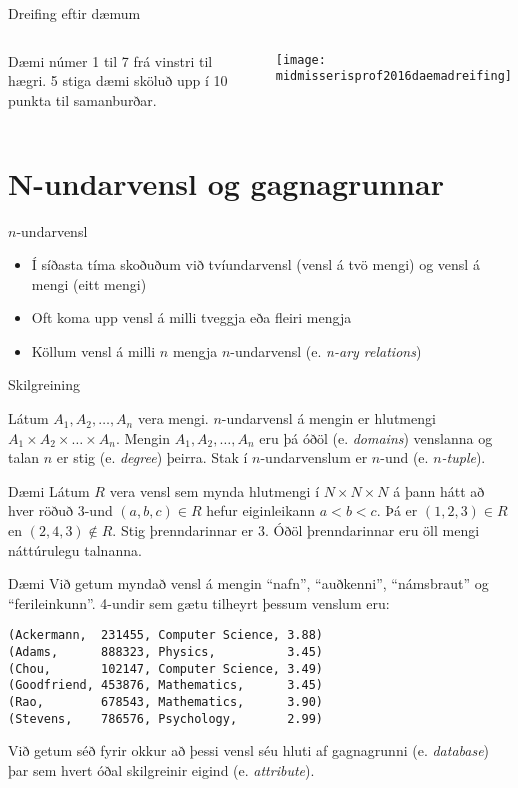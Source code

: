 \documentclass{beamer}
\begin{document}
\begin{frame}{Dreifing eftir dæmum}
\begin{columns}
Dæmi númer 1 til 7 frá vinstri til hægri. 5 stiga dæmi sköluð upp í 10 punkta til samanburðar.
\begin{center}
\texttt{[image: midmisserisprof2016daemadreifing]}
\end{center}
\end{columns}
\end{frame}

\section{N-undarvensl og gagnagrunnar}

\begin{frame}{$n$-undarvensl}
\begin{itemize}
 \item Í síðasta tíma skoðuðum við tvíundarvensl (vensl á tvö mengi) og vensl á mengi (eitt mengi)
 \item Oft koma upp vensl á milli tveggja eða fleiri mengja
 \item Köllum vensl á milli $n$ mengja $n$-undarvensl (e. \emph{n-ary relations})
\end{itemize}
\end{frame}

\begin{frame}{Skilgreining}
\begin{tcolorbox}[title=n-undarvensl]
Látum $A_1, A_2, \ldots, A_n$ vera mengi. $n$-undarvensl á mengin er hlutmengi $A_1 \times A_2 \times \ldots \times A_n$. Mengin $A_1, A_2, \ldots, A_n$ eru þá óðöl (e. \emph{domains}) venslanna og talan $n$ er stig (e. \emph{degree}) þeirra. Stak í $n$-undarvenslum er $n$-und (e. \emph{$n$-tuple}).
\end{tcolorbox}
\end{frame}

\begin{frame}{Dæmi}
Látum $R$ vera vensl sem mynda hlutmengi í $N \times N \times N$ á þann hátt að hver röðuð 3-und $(a, b, c) \in R$ hefur eiginleikann $a < b < c$. Þá er $(1, 2, 3) \in R$ en $(2, 4, 3) \notin R$. Stig þrenndarinnar er 3. Óðöl þrenndarinnar eru öll mengi náttúrulegu talnanna.
\end{frame}

\begin{frame}[fragile]{Dæmi}
Við getum myndað vensl á mengin ``nafn'', ``auðkenni'', ``námsbraut'' og ``ferileinkunn''. 4-undir sem gætu tilheyrt þessum venslum eru:

\begin{verbatim}
(Ackermann,  231455, Computer Science, 3.88)
(Adams,      888323, Physics,          3.45)
(Chou,       102147, Computer Science, 3.49)
(Goodfriend, 453876, Mathematics,      3.45)
(Rao,        678543, Mathematics,      3.90)
(Stevens,    786576, Psychology,       2.99)
\end{verbatim}
Við getum séð fyrir okkur að þessi vensl séu hluti af gagnagrunni (e. \emph{database}) þar sem hvert óðal skilgreinir eigind (e. \emph{attribute}). 
\end{frame}
\end{document}
